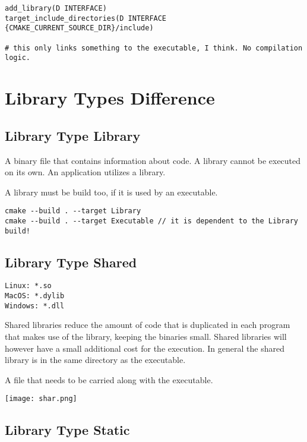 \documentclass[openany]{report}
\begin{document}
\begin{verbatim}
add_library(D INTERFACE)
target_include_directories(D INTERFACE {CMAKE_CURRENT_SOURCE_DIR}/include)

# this only links something to the executable, I think. No compilation logic.
\end{verbatim}


\section{Library Types Difference}

\subsection{Library Type Library}

A binary file that contains information about code.
A library cannot be executed on its own.
An application utilizes a library.

A library must be build too, if it is used by an executable.

\begin{verbatim}
cmake --build . --target Library
cmake --build . --target Executable // it is dependent to the Library build!
\end{verbatim}

\subsection{Library Type Shared}

\begin{verbatim}
Linux: *.so
MacOS: *.dylib
Windows: *.dll
\end{verbatim}

Shared libraries reduce the amount of code that is duplicated in each program that makes use of the library, keeping the binaries small.
Shared libraries will however have a small additional cost for the execution.
In general the shared library is in the same directory as the executable.

A file that needs to be carried along with the executable.

\begin{center}
    \texttt{[image: shar.png]}
\end{center}


\subsection{Library Type Static}
\end{document}
